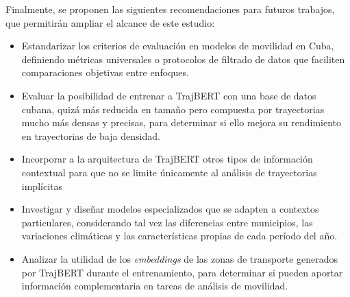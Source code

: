 \begin{recomendations}

    Finalmente, se proponen las siguientes recomendaciones para futuros trabajos, que permitirán ampliar el alcance de este estudio:
    
    \begin{itemize}
        \item Estandarizar los criterios de evaluación en modelos de movilidad en Cuba, definiendo métricas universales o protocolos de filtrado de datos que faciliten comparaciones objetivas entre enfoques.
        \item Evaluar la posibilidad de entrenar a TrajBERT con una base de datos cubana, quizá más reducida en tamaño pero compuesta por trayectorias mucho más densas y precisas, para determinar si ello mejora su rendimiento en trayectorias de baja densidad.
        \item Incorporar a la arquitectura de TrajBERT otros tipos de información contextual para que no se limite únicamente al análisis de trayectorias implícitas
        \item Investigar y diseñar modelos especializados que se adapten a contextos particulares, considerando tal vez las diferencias entre municipios, las variaciones climáticas y las características propias de cada período del año.
        \item Analizar la utilidad de los \textit{embeddings} de las zonas de transporte generados por TrajBERT durante el entrenamiento, para determinar si pueden aportar información complementaria en tareas de análisis de movilidad.
    \end{itemize}
    
\end{recomendations}